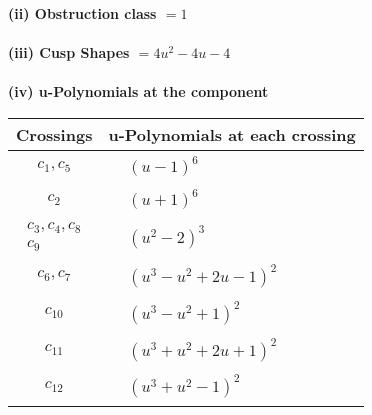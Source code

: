 \documentclass[1p]{elsarticle_modified}
\theoremstyle{definition}
\begin{document}
\flushleft \textbf{(ii) Obstruction class $= 1$}\\~\\
\flushleft \textbf{(iii) Cusp Shapes $= 4 u^2-4 u-4$}\\~\\
\newpage\renewcommand{\arraystretch}{1}
\flushleft \textbf{(iv) u-Polynomials at the component}\newline \\
\begin{tabular}{m{50pt}|m{274pt}}
Crossings & \hspace{64pt}u-Polynomials at each crossing \\
\hline $$\begin{aligned}c_{1},c_{5}\end{aligned}$$&$\begin{aligned}
&(u-1)^6
\end{aligned}$\\
\hline $$\begin{aligned}c_{2}\end{aligned}$$&$\begin{aligned}
&(u+1)^6
\end{aligned}$\\
\hline $$\begin{aligned}c_{3},c_{4},c_{8}\\c_{9}\end{aligned}$$&$\begin{aligned}
&(u^2-2)^3
\end{aligned}$\\
\hline $$\begin{aligned}c_{6},c_{7}\end{aligned}$$&$\begin{aligned}
&(u^3- u^2+2 u-1)^2
\end{aligned}$\\
\hline $$\begin{aligned}c_{10}\end{aligned}$$&$\begin{aligned}
&(u^3- u^2+1)^2
\end{aligned}$\\
\hline $$\begin{aligned}c_{11}\end{aligned}$$&$\begin{aligned}
&(u^3+u^2+2 u+1)^2
\end{aligned}$\\
\hline $$\begin{aligned}c_{12}\end{aligned}$$&$\begin{aligned}
&(u^3+u^2-1)^2
\end{aligned}$\\
\hline
\end{tabular}\\~\\
\end{document}
